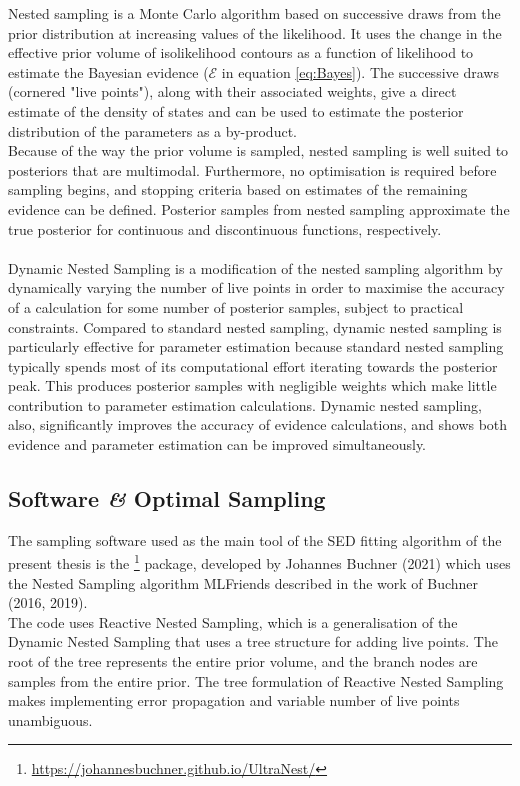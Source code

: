 Nested sampling\cite{Skilling2006} is a Monte Carlo algorithm based on successive draws from the prior distribution at increasing values of the likelihood. It uses\cite{NestSam2021} the change in the effective prior volume of isolikelihood contours as a function of likelihood to estimate the Bayesian evidence ($\mathscr{E}$ in equation  \ref{eq:Bayes}). The successive draws (cornered "live points"), along with their associated weights, give a direct estimate of the density of states and can be used to estimate the posterior distribution of the parameters as a by-product.\\
Because of the way the prior volume is sampled, nested sampling is well suited to posteriors that are multimodal. Furthermore, no optimisation is required before sampling begins, and stopping criteria based on estimates of the remaining evidence can be defined.
Posterior samples from nested sampling approximate the true posterior for continuous and discontinuous functions, respectively\cite{NestSample_2016}. \\ \\
Dynamic Nested Sampling is a modification of the nested sampling algorithm by dynamically varying the number of live points in order to maximise the accuracy of a calculation for some number of posterior samples, subject to practical constraints. Compared to standard nested sampling, dynamic nested sampling is particularly effective for parameter estimation because standard nested sampling typically spends most of its computational effort iterating towards the posterior peak. This produces posterior samples with negligible weights which make little contribution to parameter estimation calculations. Dynamic nested sampling, also, significantly improves\cite{Higson2019} the accuracy of evidence calculations, and shows both evidence and parameter estimation can be improved simultaneously.

\subsection{Software \textit{\&} Optimal Sampling}

The sampling software used as the main tool of the SED fitting algorithm of the present thesis is the  \footnote{\url{https://johannesbuchner.github.io/UltraNest/}} package, developed by Johannes Buchner (2021)\cite{ultranest2021} which uses the Nested Sampling algorithm MLFriends described in the work of Buchner (2016, 2019)\cite{NestSample_2016}\cite{NestSample_2019}. \\
The  code uses Reactive Nested Sampling, which is a generalisation of the Dynamic Nested Sampling that uses a tree structure for adding live points. The root of the tree represents the entire prior volume, and the branch nodes are samples from the entire prior. The tree formulation of Reactive Nested Sampling makes implementing error propagation and variable number of live points unambiguous. 

